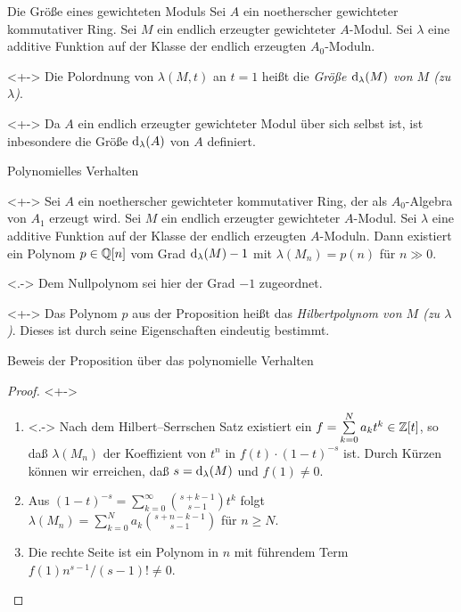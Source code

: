 \begin{frame}{Die Größe eines gewichteten Moduls}
	Sei \(A\) ein noetherscher gewichteter kommutativer Ring.
	Sei \(M\) ein endlich erzeugter gewichteter \(A\)-Modul. Sei
	\(\lambda\) eine additive Funktion auf der Klasse der endlich erzeugten
	\(A_0\)-Moduln.
	\begin{definition}<+->
		Die Polordnung von \(\lambda(M, t)\) an \(t = 1\) heißt die \emph{Größe \(\operatorname{d}_\lambda(M)\)
		von \(M\) (zu \(\lambda\))}.
	\end{definition}
	\begin{example}<+->
		Da \(A\) ein endlich erzeugter gewichteter Modul über sich selbst ist, ist inbesondere
		die Größe \(\operatorname{d}_\lambda(A)\) von \(A\) definiert.
	\end{example}
\end{frame}

\begin{frame}{Polynomielles Verhalten}
	\begin{proposition}<+->
		Sei \(A\) ein noetherscher gewichteter kommutativer Ring, der als \(A_0\)-Algebra von \(A_1\) erzeugt wird.
		Sei \(M\) ein endlich erzeugter gewichteter \(A\)-Modul.
		Sei \(\lambda\) eine additive Funktion auf der Klasse der endlich erzeugten \(A\)-Moduln.
		Dann existiert ein Polynom \(p \in \mathbb Q[n]\) vom Grad \(\operatorname{d}_\lambda(M) - 1\) mit \(\lambda(M_n) = p(n)\)
		für \(n \gg 0\).
	\end{proposition}
	\begin{visibleenv}<.->
		Dem Nullpolynom sei hier der Grad \(-1\) zugeordnet.
	\end{visibleenv}
	\begin{visibleenv}<+->
		Das Polynom \(p\) aus der Proposition heißt das
		\emph{Hilbertpolynom von \(M\) (zu \(\lambda\))}. Dieses ist durch
		seine Eigenschaften eindeutig bestimmt.
	\end{visibleenv}
\end{frame}

\begin{frame}{Beweis der Proposition über das polynomielle Verhalten}
	\begin{proof}<+->
		\begin{enumerate}[<+->]
		\item<.->
			Nach dem Hilbert--Serrschen Satz existiert ein
			\(f = \sum\limits_{k = 0}^N a_k t^k \in \mathbb Z[t]\), so daß \(\lambda(M_n)\)
			der Koeffizient von \(t^n\) in \(f(t) \cdot (1 - t)^{-s}\) ist. Durch
			Kürzen können wir erreichen, daß
			\(s = \operatorname{d}_\lambda(M)\) und \(f(1) \neq 0\).
		\item
			Aus \((1 - t)^{-s} = \sum\limits_{k = 0}^\infty \binom{s + k - 1}{s - 1} t^k\) folgt
			\(\lambda(M_n) = \sum\limits_{k = 0}^N a_k \binom{s + n - k - 1}{s - 1}\) für \(n \ge N\).
		\item
			Die rechte Seite ist ein Polynom in \(n\) mit führendem Term
			\(f(1) n^{s - 1}/(s - 1)! \neq 0\).
			\qedhere
		\end{enumerate}
	\end{proof}
\end{frame}

